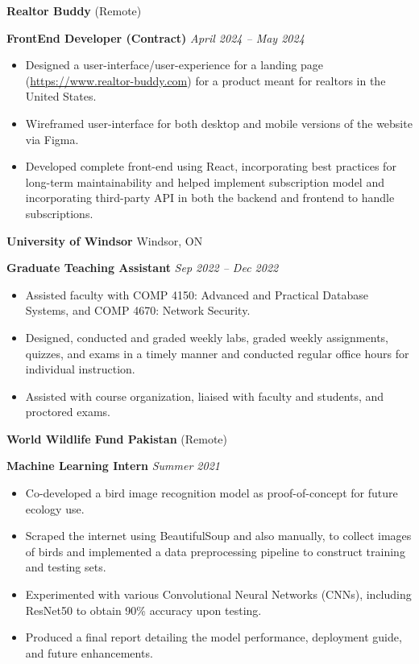 \documentclass[12pt, a4paper]{article}
\begin{document}
\textbf{Realtor Buddy} \hfill (Remote)

\textbf{FrontEnd Developer (Contract)} \hfill \textit{April 2024 -- May 2024}
\begin{itemize}[noitemsep, topsep=0pt, partopsep=0pt, parsep=0pt]
    \item Designed a user-interface/user-experience for a landing page (\url{https://www.realtor-buddy.com}) for a product meant for realtors in the United States. 
    \item Wireframed user-interface for both desktop and mobile versions of the website via Figma. 
    \item Developed complete front-end using React, incorporating best practices for long-term maintainability and helped implement subscription model and incorporating third-party API in both the backend and frontend to handle subscriptions. 
    \end{itemize}
    
\vspace{16pt}
\textbf{University of Windsor} \hfill Windsor, ON

\textbf{Graduate Teaching Assistant} \hfill \textit{Sep 2022 -- Dec 2022}
\begin{itemize}[noitemsep, topsep=0pt, partopsep=0pt, parsep=0pt]
    \item Assisted faculty with COMP 4150: Advanced and Practical Database Systems, and COMP 4670: Network Security.
    \item Designed, conducted and graded weekly labs, graded weekly assignments, quizzes, and exams in a timely manner and conducted regular office hours for individual instruction. 
    \item Assisted with course organization, liaised with faculty and students, and proctored exams.  
\end{itemize}

\vspace{12pt}
\textbf{World Wildlife Fund Pakistan} \hfill (Remote)

\textbf{Machine Learning Intern} \hfill \textit{Summer 2021}

\begin{itemize}[noitemsep, topsep=0pt, partopsep=0pt, parsep=0pt]
    \item Co-developed a bird image recognition model as proof-of-concept for future ecology use.
    \item Scraped the internet using BeautifulSoup and also manually, to collect images of birds and implemented a data preprocessing pipeline to construct training and testing sets. 
    \item Experimented with various Convolutional Neural Networks (CNNs), including ResNet50 to obtain 90\% accuracy upon testing. 
    \item Produced a final report detailing the model performance, deployment guide, and future enhancements. 
\end{itemize}
\end{document}
